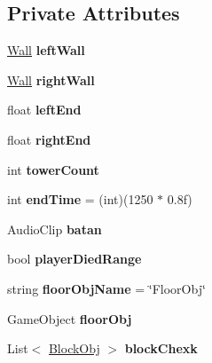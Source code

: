 \subsection*{Private Attributes}
\begin{DoxyCompactItemize}
\item 
\mbox{\label{class_tower_a2ed8c698f1611007c14baeaee2ae4582}} 
\hyperlink{class_wall}{Wall} {\bfseries left\+Wall}
\item 
\mbox{\label{class_tower_a48afd1f3d4785f843d26f117bd559b8a}} 
\hyperlink{class_wall}{Wall} {\bfseries right\+Wall}
\item 
\mbox{\label{class_tower_a446443ca89df0877642e2ae8142a5dc0}} 
float {\bfseries left\+End}
\item 
\mbox{\label{class_tower_a2bf2fe454c186e72883e8a1bfa8786e5}} 
float {\bfseries right\+End}
\item 
\mbox{\label{class_tower_afcc853a988af4aecb5ce1e5d21476117}} 
int {\bfseries tower\+Count}
\item 
\mbox{\label{class_tower_a960c48cbc697e1fb7a2e61fb42704c21}} 
int {\bfseries end\+Time} = (int)(1250 $\ast$ 0.\+8f)
\item 
\mbox{\label{class_tower_afab98b12b467829d02905a7ddf7401ed}} 
Audio\+Clip {\bfseries batan}
\item 
\mbox{\label{class_tower_a87aadb56854248dd085e55d1ec4c3daa}} 
bool {\bfseries player\+Died\+Range}
\item 
\mbox{\label{class_tower_aaf6c9efd8e1753175a2df033ba918b19}} 
string {\bfseries floor\+Obj\+Name} = \char`\"{}Floor\+Obj\char`\"{}
\item 
\mbox{\label{class_tower_ad30bbf3df003f612f3d2e2a676d1ca16}} 
Game\+Object {\bfseries floor\+Obj}
\item 
\mbox{\label{class_tower_acdbfbaac3abf53313182d6a9254c547f}} 
List$<$ \hyperlink{class_block_obj}{Block\+Obj} $>$ {\bfseries block\+Chexk}
\end{DoxyCompactItemize}


